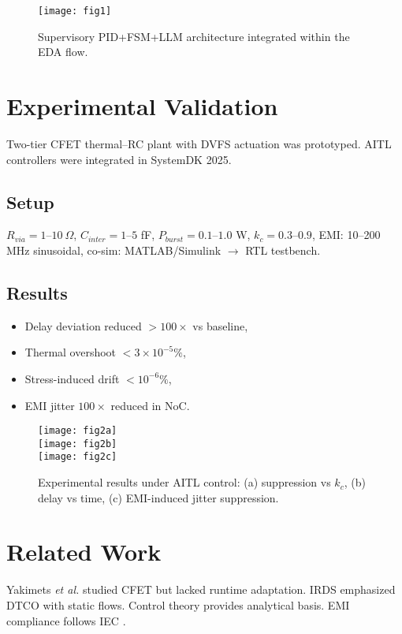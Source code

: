 \documentclass[conference]{IEEEtran}
\begin{document}
\begin{figure}[t]
\centering
\texttt{[image: fig1]}
\caption{Supervisory PID+FSM+LLM architecture integrated within the EDA flow.}
\label{fig:fig1}
\end{figure}

\section{Experimental Validation}
Two-tier CFET thermal–RC plant with DVFS actuation was prototyped. AITL controllers were integrated in SystemDK 2025.

\subsection{Setup}
$R_{via}=1$–$10\ \Omega$, $C_{inter}=1$–$5$ fF, $P_{burst}=0.1$–$1.0$ W, $k_c=0.3$–$0.9$, EMI: 10–200 MHz sinusoidal, co-sim: MATLAB/Simulink $\rightarrow$ RTL testbench.

\subsection{Results}
\begin{itemize}
\item Delay deviation reduced $>100\times$ vs baseline,
\item Thermal overshoot $<3\times10^{-5}\%$,
\item Stress-induced drift $<10^{-6}\%$,
\item EMI jitter $100\times$ reduced in NoC.
\end{itemize}

\begin{figure}[t]
\centering
\texttt{[image: fig2a]}\\[10pt]
\texttt{[image: fig2b]}\\[10pt]
\texttt{[image: fig2c]}
\caption{Experimental results under AITL control: (a) suppression vs $k_c$, (b) delay vs time, (c) EMI-induced jitter suppression.}
\label{fig:fig2}
\end{figure}

\section{Related Work}
Yakimets \emph{et al.} \cite{yakimets2020} studied CFET but lacked runtime adaptation. IRDS \cite{irds2023} emphasized DTCO with static flows. Control theory \cite{franklin2015,anderson2007,khalil2002} provides analytical basis. EMI compliance follows IEC \cite{iec2019}.
\end{document}
